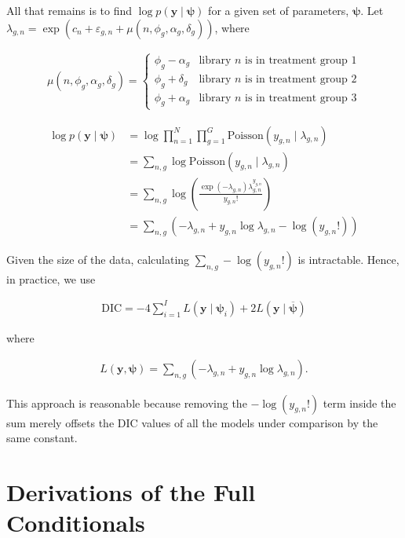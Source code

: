 \documentclass{article}\usepackage{graphicx, color}
\providecommand{\e}{\varepsilon}
\providecommand{\ov}[1]{\overline{#1}}
\providecommand{\vc}[1]{\boldsymbol{#1}}
\begin{document}
\begin{flushleft}
All that remains is to find $\log p(\vc{y} \mid \vc{\psi})$ for a given set of parameters, $\vc{\psi}$. Let $\lambda_{g, n} = \exp(c_n + \e_{g, n} + \mu(n, \phi_g, \alpha_g, \delta_g))$, where 

\begin{align*}
\mu(n, \phi_g, \alpha_g, \delta_g) = \begin{cases}
\phi_g - \alpha_g & \text{library $n$ is in treatment group 1} \\
\phi_g + \delta_g & \text{library $n$ is in treatment group 2} \\
\phi_g + \alpha_g & \text{library $n$ is in treatment group 3}
\end{cases}
\end{align*}

\begin{align*}
\log p(\vc{y} \mid \vc{\psi}) &= \log \prod_{n = 1}^N \prod_{g = 1}^G \text{Poisson}( y_{g, n} \mid \lambda_{g, n}) \\
&= \sum_{n, g} \log \text{Poisson}( y_{g, n} \mid \lambda_{g, n}) \\
&= \sum_{n, g} \log \left (\frac{\exp(-\lambda_{g, n}) \lambda_{g, n}^{y_{g, n}}}{y_{g, n}!} \right) \\
&= \sum_{n, g}( -\lambda_{g, n} + y_{g, n} \log \lambda_{g, n} - \log (y_{g, n}!))
\end{align*}

Given the size of the data, calculating $ \sum_{n, g} - \log (y_{g, n}!)$ is intractable. Hence, in practice, we use

\begin{align*}
\text{DIC} = -4 \sum_{i = 1}^I L(\vc{y} \mid \vc{\psi}_i) + 2 L(\vc{y} \mid \ov{\vc{\psi}})
\end{align*}

where 

\begin{align*}
L(\vc{y}, \vc{\psi}) = \sum_{n, g}( -\lambda_{g, n} + y_{g, n} \log \lambda_{g, n}).
\end{align*}

This approach is reasonable because removing the $-\log (y_{g, n}!)$ term inside the sum merely offsets the DIC values of all the models under comparison by the same constant.
 
\appendix

\section{Derivations of the Full Conditionals}


\end{flushleft}
\end{document}
